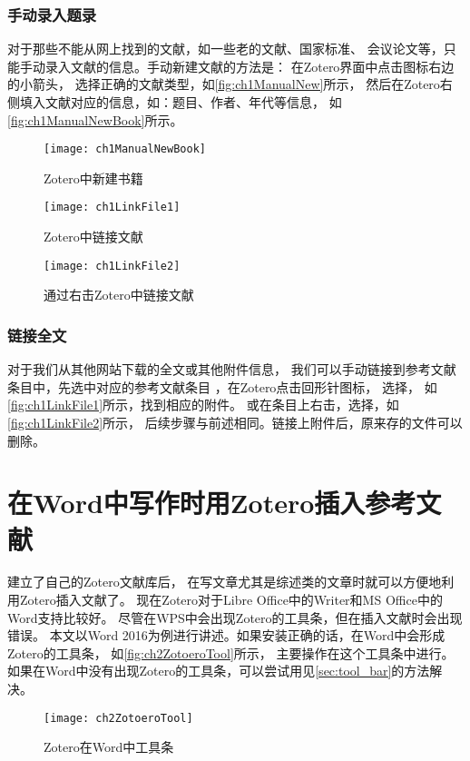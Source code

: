\documentclass[cn,11pt,chinese]{elegantbook}
\begin{document}
	\subsection{手动录入题录}\label{sec:ManualImport}
	对于那些不能从网上找到的文献，如一些老的文献、国家标准、
	会议论文等，只能手动录入文献的信息。手动新建文献的方法是：
	在Zotero界面中点击\menu{+}图标右边的小箭头，
	选择正确的文献类型，如\autoref{fig:ch1ManualNew}所示，
	然后在Zotero右侧填入文献对应的信息，如：题目、作者、年代等信息，
	如\autoref{fig:ch1ManualNewBook}所示。
			\begin{figure}
					\centering
					\begin{minipage}[t]{\dimexpr0.5\textwidth-4em}
					\centering
					\texttt{[image: ch1ManualNewBook]}
					\caption{Zotero中新建书籍}
					\label{fig:ch1ManualNewBook}
				\end{minipage}	
				\hspace{2cm}
				\begin{minipage}[t]{\dimexpr0.5\textwidth-4em}
					\centering
					\texttt{[image: ch1LinkFile1]}
					\caption{Zotero中链接文献}
					\label{fig:ch1LinkFile1}
				\end{minipage}	
			\end{figure}
			\begin{figure}
				\centering
				\texttt{[image: ch1LinkFile2]}
				\caption{通过右击Zotero中链接文献}
				\label{fig:ch1LinkFile2}
			\end{figure}
		\subsection{链接全文}\label{sec:linkFulltex}
				对于我们从其他网站下载的全文或其他附件信息，
				我们可以手动链接到参考文献条目中，先选中对应的参考文献条目
				，在Zotero点击回形针图标，
				选择，
				如\autoref{fig:ch1LinkFile1}所示，找到相应的附件。
				或在条目上右击，选择，如\autoref{fig:ch1LinkFile2}所示，
				后续步骤与前述相同。链接上附件后，原来存的文件可以删除。


\chapter{在Word中写作时用Zotero插入参考文献}\label{ch:insert}
		建立了自己的Zotero文献库后，
		在写文章尤其是综述类的文章时就可以方便地利用Zotero插入文献了。
		现在Zotero对于Libre Office中的Writer和MS Office中的Word支持比较好。
		尽管在WPS中会出现Zotero的工具条，但在插入文献时会出现错误。
		本文以Word 2016为例进行讲述。如果安装正确的话，在Word中会形成Zotero的工具条，
		如\autoref{fig:ch2ZotoeroTool}所示，
		主要操作在这个工具条中进行。
		如果在Word中没有出现Zotero的工具条，可以尝试用见\cref{sec:tool_bar}的方法解决。
			\begin{figure}[htbp]
				\centering
				\texttt{[image: ch2ZotoeroTool]}
				\caption{Zotero在Word中工具条}
				\label{fig:ch2ZotoeroTool}
			\end{figure}
		
\end{document}
